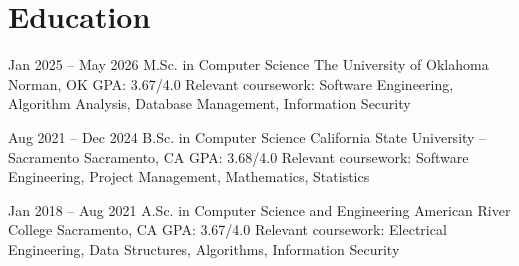 \section{Education}

\cventry
    {Jan 2025 -- May 2026}
    {M.Sc. in Computer Science}
    {The University of Oklahoma}
    {Norman, OK}
    {GPA: 3.67/4.0}
    {%
        Relevant coursework: Software Engineering, Algorithm Analysis,
        Database Management, Information Security
    }

\cventry
    {Aug 2021 -- Dec 2024}
    {B.Sc. in Computer Science}
    {California State University -- Sacramento}
    {Sacramento, CA}
    {GPA: 3.68/4.0}
    {%
        Relevant coursework: Software Engineering, Project Management,
        Mathematics, Statistics
    }

\cventry
    {Jan 2018 -- Aug 2021}
    {A.Sc. in Computer Science and Engineering}
    {American River College}
    {Sacramento, CA}
    {GPA: 3.67/4.0}
    {%
        Relevant coursework: Electrical Engineering, Data Structures,
        Algorithms, Information Security
    }